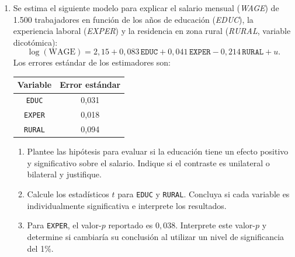 \documentclass[letterpaper,11pt]{article}
\begin{document}
\begin{enumerate}[resume]

\item Se estima el siguiente modelo para explicar el salario mensual
    (\emph{WAGE}) de 1.500 trabajadores en función de los años de educación
    (\emph{EDUC}), la experiencia laboral (\emph{EXPER}) y la residencia en
    zona rural (\emph{RURAL}, variable dicotómica):
    \[
        \log(\text{WAGE})
        =2{,}15+0{,}083\,\texttt{EDUC}
        +0{,}041\,\texttt{EXPER}
        -0{,}214\,\texttt{RURAL}+u.
    \]
    Los errores estándar de los estimadores son:
    \begin{center}
        \begin{tabular}{|c|c|}
            \hline
            \textbf{Variable} & \textbf{Error estándar}\\
            \hline
            \texttt{EDUC}  & 0{,}031\\
            \hline
            \texttt{EXPER} & 0{,}018\\
            \hline
            \texttt{RURAL} & 0{,}094\\
            \hline
        \end{tabular}
    \end{center}
    \begin{enumerate}[label=(\alph*)]
        \item Plantee las hipótesis para evaluar si la educación tiene un
              efecto positivo y significativo sobre el salario. Indique si el
              contraste es unilateral o bilateral y justifique.
        \item Calcule los estadísticos $t$ para \texttt{EDUC} y \texttt{RURAL}.
              Concluya si cada variable es individualmente significativa e
              interprete los resultados.
        \item Para \texttt{EXPER}, el valor-$p$ reportado es $0{,}038$.
              Interprete este valor-$p$ y determine si cambiaría su conclusión
              al utilizar un nivel de significancia del 1\%.
    \end{enumerate}


\end{enumerate}
\end{document}
